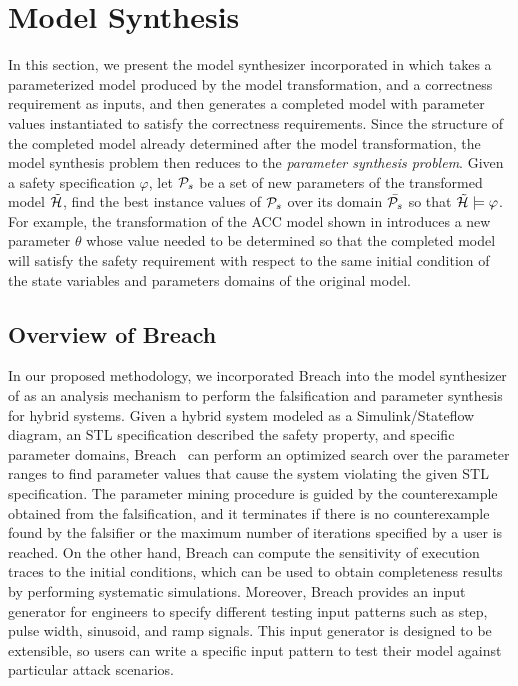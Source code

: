 \section{Model Synthesis}
%
In this section, we present the model synthesizer incorporated in \toolreaffirm which takes a parameterized model produced by the model transformation, and a correctness requirement as inputs, and then generates a completed model with parameter values instantiated to satisfy the correctness requirements. Since the structure of the completed model already determined after the model transformation, the model synthesis problem then reduces to the \emph{parameter synthesis problem}. Given a safety specification $\varphi$, let $\P_s$ be a set of new parameters of the transformed model $\tilde{\AutomatonH}$, find the best instance values of $\P_s$ over its domain $\bar{\P_s}$ so that $\tilde{\AutomatonH} \models\varphi$.  
%
For example, the transformation of the ACC model shown in  introduces a new parameter $\theta$ whose value needed to be determined so that the completed model will satisfy the safety requirement with respect to the same initial condition of the state variables and parameters domains of the original model.
%
%
\subsection{Overview of Breach}
%
%
In our proposed methodology, we incorporated Breach into the model synthesizer of \toolreaffirm as an analysis mechanism to perform the falsification and parameter synthesis for hybrid systems. Given a hybrid system modeled as a Simulink/Stateflow diagram, an STL specification described the safety property, and specific parameter domains, Breach~\cite{donze2010breach} can perform an optimized search over the parameter ranges to find parameter values that cause the system violating the given STL specification. 
%
%
The parameter mining procedure is guided by the counterexample obtained from the falsification, and it terminates if there is no counterexample found by the falsifier or the maximum number of iterations specified by a user is reached.
%
On the other hand, Breach can compute the sensitivity of execution traces to the initial conditions, which can be used to obtain completeness results by performing systematic simulations. Moreover, Breach provides an input generator for engineers to specify different testing input patterns such as step, pulse width, sinusoid, and ramp signals. This input generator is designed to be extensible, so users can write a specific input pattern to test their model against particular attack scenarios.


